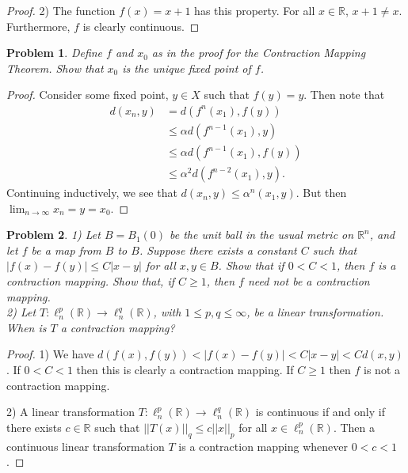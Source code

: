 \documentclass{article}
\newtheorem{problem}{Problem}
\begin{document}
\begin{flushleft}
\begin{proof}
2) The function $f(x) = x+1$ has this property. For all $x \in \mathbb{R}$, $x + 1 \neq x$. Furthermore, $f$ is clearly continuous.
\end{proof}

\begin{problem}
Define $f$ and $x_0$ as in the proof for the Contraction Mapping Theorem. Show that $x_0$ is the unique fixed point of $f$.
\end{problem}
\begin{proof}
Consider some fixed point, $y \in X$ such that $f(y) = y$. Then note that
\begin{align*}
d(x_n, y)
&= d(f^n(x_1), f(y))\\
&\leq \alpha d(f^{n-1}(x_1), y)\\
&\leq \alpha d(f^{n-1}(x_1), f(y))\\
&\leq \alpha^2 d(f^{n-2}(x_1), y).
\end{align*}
Continuing inductively, we see that $d(x_n, y) \leq \alpha^n (x_1, y)$. But then $\lim_{n \rightarrow \infty} x_n = y = x_0$.
\end{proof}

\begin{problem}
1) Let $B = B_1(0)$ be the unit ball in the usual metric on $\mathbb{R}^n$, and let $f$ be a map from $B$ to $B$. Suppose there exists a constant $C$ such that $|f(x) - f(y)| \leq C |x-y|$ for all $x,y \in B$. Show that if $0 < C < 1$, then $f$ is a contraction mapping. Show that, if $C \geq 1$, then $f$ need not be a contraction mapping.\\
2) Let $T : \ell_n^p (\mathbb{R}) \rightarrow \ell_n^q (\mathbb{R})$, with $1 \leq p, q \leq \infty$, be a linear transformation. When is $T$ a contraction mapping?
\end{problem}
\begin{proof}
1) We have $d(f(x), f(y)) < |f(x) - f(y)| < C |x - y| < C d(x, y)$. If $0 < C < 1$ then this is clearly a contraction mapping. If $C \geq 1$ then $f$ is not a contraction mapping.\newline

2) A linear transformation $T : \ell_n^p (\mathbb{R}) \rightarrow \ell_n^q (\mathbb{R})$ is continuous if and only if there exists $c \in \mathbb{R}$ such that $||T(x)||_q \leq c ||x||_p$ for all $x \in \ell_n^p (\mathbb{R})$. Then a continuous linear transformation $T$ is a contraction mapping whenever $0 < c < 1$.
\end{proof}


\end{flushleft}
\end{document}

